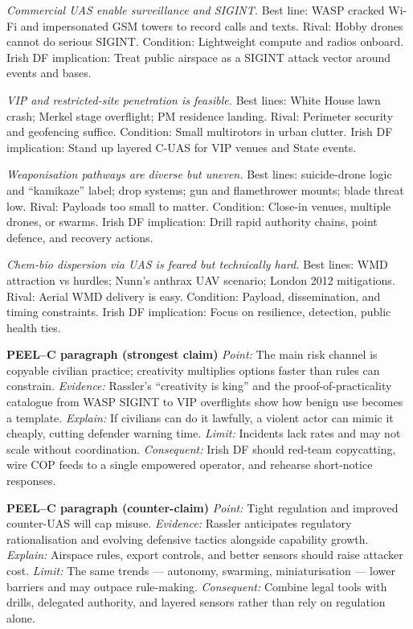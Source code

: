 \textit{Commercial UAS enable surveillance and SIGINT.} Best line: WASP cracked Wi-Fi and impersonated GSM towers to record calls and texts. Rival: Hobby drones cannot do serious SIGINT. Condition: Lightweight compute and radios onboard. Irish DF implication: Treat public airspace as a SIGINT attack vector around events and bases.

\textit{VIP and restricted-site penetration is feasible.} Best lines: White House lawn crash; Merkel stage overflight; PM residence landing. Rival: Perimeter security and geofencing suffice. Condition: Small multirotors in urban clutter. Irish DF implication: Stand up layered C-UAS for VIP venues and State events.

\textit{Weaponisation pathways are diverse but uneven.} Best lines: suicide-drone logic and “kamikaze” label; drop systems; gun and flamethrower mounts; blade threat low. Rival: Payloads too small to matter. Condition: Close-in venues, multiple drones, or swarms. Irish DF implication: Drill rapid authority chains, point defence, and recovery actions.

\textit{Chem-bio dispersion via UAS is feared but technically hard.} Best lines: WMD attraction vs hurdles; Nunn’s anthrax UAV scenario; London 2012 mitigations. Rival: Aerial WMD delivery is easy. Condition: Payload, dissemination, and timing constraints. Irish DF implication: Focus on resilience, detection, public health ties.

\textbf{PEEL–C paragraph (strongest claim)}
\textit{Point:} The main risk channel is copyable civilian practice; creativity multiplies options faster than rules can constrain.
\textit{Evidence:} Rassler’s “creativity is king” and the proof-of-practicality catalogue from WASP SIGINT to VIP overflights show how benign use becomes a template.
\textit{Explain:} If civilians can do it lawfully, a violent actor can mimic it cheaply, cutting defender warning time.
\textit{Limit:} Incidents lack rates and may not scale without coordination.
\textit{Consequent:} Irish DF should red-team copycatting, wire COP feeds to a single empowered operator, and rehearse short-notice responses.

\textbf{PEEL–C paragraph (counter-claim)}
\textit{Point:} Tight regulation and improved counter-UAS will cap misuse.
\textit{Evidence:} Rassler anticipates regulatory rationalisation and evolving defensive tactics alongside capability growth.
\textit{Explain:} Airspace rules, export controls, and better sensors should raise attacker cost.
\textit{Limit:} The same trends — autonomy, swarming, miniaturisation — lower barriers and may outpace rule-making.
\textit{Consequent:} Combine legal tools with drills, delegated authority, and layered sensors rather than rely on regulation alone.


